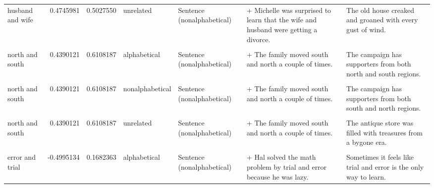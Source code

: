 \documentclass[
  12pt,
]{scrartcl}
\begin{document}
\begin{landscape}
\begin{longtable}{lrrllll}
husband and wife & 0.4745981 & 0.5027550 & unrelated & Sentence (nonalphabetical) & + Michelle was surprised to learn that the wife and husband were getting a divorce. & The old house creaked and groaned with every gust of wind.\\
\cellcolor{gray!6}{north and south} & \cellcolor{gray!6}{0.4390121} & \cellcolor{gray!6}{0.6108187} & \cellcolor{gray!6}{alphabetical} & \cellcolor{gray!6}{Sentence (alphabetical)} & \cellcolor{gray!6}{+ The family moved north and south a couple of times.} & \cellcolor{gray!6}{The campaign has supporters from both north and south regions.}\\
north and south & 0.4390121 & 0.6108187 & alphabetical & Sentence (nonalphabetical) & + The family moved south and north a couple of times. & The campaign has supporters from both north and south regions.\\
\addlinespace
\cellcolor{gray!6}{north and south} & \cellcolor{gray!6}{0.4390121} & \cellcolor{gray!6}{0.6108187} & \cellcolor{gray!6}{nonalphabetical} & \cellcolor{gray!6}{Sentence (alphabetical)} & \cellcolor{gray!6}{+ The family moved north and south a couple of times.} & \cellcolor{gray!6}{The campaign has supporters from both south and north regions.}\\
north and south & 0.4390121 & 0.6108187 & nonalphabetical & Sentence (nonalphabetical) & + The family moved south and north a couple of times. & The campaign has supporters from both south and north regions.\\
\cellcolor{gray!6}{north and south} & \cellcolor{gray!6}{0.4390121} & \cellcolor{gray!6}{0.6108187} & \cellcolor{gray!6}{unrelated} & \cellcolor{gray!6}{Sentence (alphabetical)} & \cellcolor{gray!6}{+ The family moved north and south a couple of times.} & \cellcolor{gray!6}{The antique store was filled with treasures from a bygone era.}\\
north and south & 0.4390121 & 0.6108187 & unrelated & Sentence (nonalphabetical) & + The family moved south and north a couple of times. & The antique store was filled with treasures from a bygone era.\\
\cellcolor{gray!6}{error and trial} & \cellcolor{gray!6}{-0.4995134} & \cellcolor{gray!6}{0.1682363} & \cellcolor{gray!6}{alphabetical} & \cellcolor{gray!6}{Sentence (alphabetical)} & \cellcolor{gray!6}{+ Hal solved the math problem by error and trial because he was lazy.} & \cellcolor{gray!6}{Sometimes it feels like trial and error is the only way to learn.}\\
\addlinespace
error and trial & -0.4995134 & 0.1682363 & alphabetical & Sentence (nonalphabetical) & + Hal solved the math problem by trial and error because he was lazy. & Sometimes it feels like trial and error is the only way to learn.\\

\end{longtable}
\end{landscape}
\end{document}
